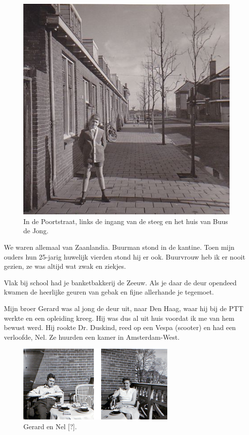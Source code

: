 \documentclass[12pt,twoside]{memoir}
\begin{document}
\begin{figure}
\includegraphics[width=\textwidth]{img/ch5/poortstrsteeg}
\caption*{\footnotesize In de Poortstraat, links de ingang van de steeg en het huis van Buus de Jong.}
\end{figure}

We waren allemaal van Zaanlandia. Buurman stond in de kantine. Toen mijn ouders hun 25-jarig huwelijk vierden stond hij er ook. Buurvrouw heb ik er nooit gezien, ze was altijd wat zwak en ziekjes. 

Vlak bij school had je banketbakkerij de Zeeuw. Als je daar de deur opendeed kwamen de heerlijke geuren van gebak en fijne allerhande je tegemoet.

Mijn broer Gerard was al jong de deur uit, naar Den Haag, waar hij bij de PTT werkte en een opleiding kreeg. Hij was dus al uit huis voordat ik me van hem bewust werd. Hij rookte Dr. Duskind, reed op een Vespa (scooter) en had een verloofde, Nel. Ze huurden een kamer in Amsterdam-West.

\begin{figure}
\includegraphics[width=\textwidth]{img/ch5/gn0102}
\caption*{\footnotesize Gerard en Nel [?].}
\end{figure}
\end{document}
